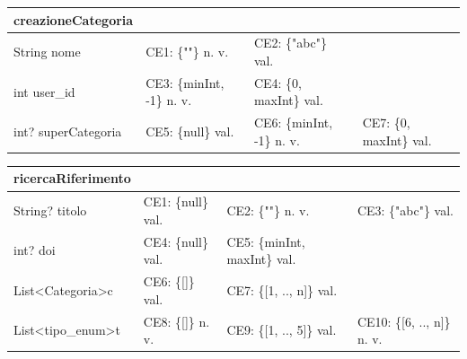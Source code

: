 \begin{table}[H]
\begin{tabular}{|l|l|l|l|}
\hline
\textbf{creazioneCategoria}  &                           &                           &                          \\ \hline
String nome         & CE1: \{""\} n. v.         & CE2: \{"abc"\} val.       &                          \\ \hline
int user\_id        & CE3: \{minInt, -1\} n. v. & CE4: \{0, maxInt\} val.   &                          \\ \hline
int? superCategoria & CE5: \{null\} val.        & CE6: \{minInt, -1\} n. v. & CE7:  \{0, maxInt\} val. \\ \hline
\end{tabular}
\end{table}

\begin{table}[H]
\begin{tabular}{|l|l|l|l|}
\hline
\textbf{ricercaRiferimento}                      &                       &                              &                                \\ \hline
String? titolo                          & CE1: \{null\} val.    & CE2: \{""\} n. v.            & CE3: \{"abc"\} val.            \\ \hline
int? doi                                & CE4: \{null\} val.    & CE5: \{minInt, maxInt\} val. &                                \\ \hline
List\textless{}Categoria\textgreater c  & CE6: \{{[}{]}\} val.  & CE7: \{{[}1, .., n{]}\} val. &                                \\ \hline
List\textless{}tipo\_enum\textgreater t & CE8: \{{[}{]}\} n. v. & CE9: \{{[}1, .., 5{]}\} val. & CE10: \{{[}6, .., n{]}\} n. v. \\ \hline
\end{tabular}
\end{table}

